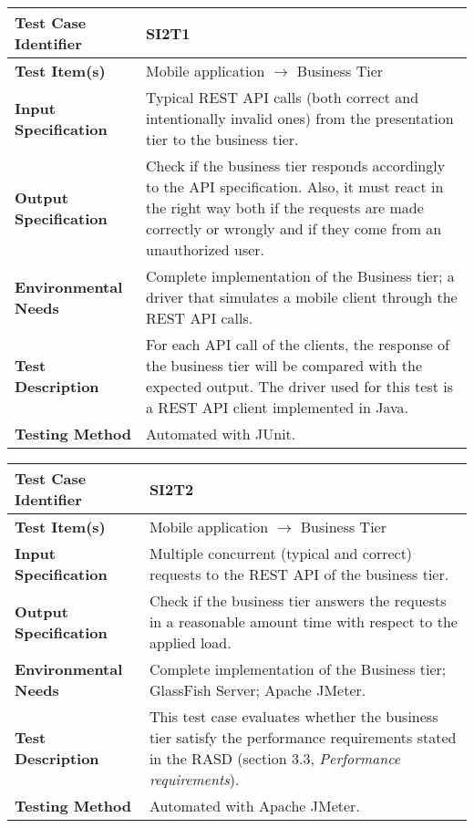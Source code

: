 \begin{tabular}{l p{}}
    \hline
    \textbf{Test Case Identifier} & SI2T1\\
    \hline
    \textbf{Test Item(s)} & Mobile application $\rightarrow$ Business Tier\\
    \hline
    \textbf{Input Specification} & Typical REST API calls (both correct and intentionally invalid ones) from the presentation tier to the business tier.\\
    \hline
    \textbf{Output Specification} & Check if the business tier responds accordingly to the API specification. Also, it must react in the right way both if the requests are made correctly or wrongly and if they come from an unauthorized user.\\
    \hline
    \textbf{Environmental Needs} & Complete implementation of the Business tier; a driver that simulates a mobile client through the REST API calls. \\
    \hline
    \textbf{Test Description} & For each API call of the clients, the response of the business tier will be compared with the expected output. The driver used for this test is a REST API client implemented in Java.\\
    \hline
    \textbf{Testing Method} & Automated with JUnit.\\
    \hline
\end{tabular}

\vspace{2em}

\noindent\begin{tabular}{l p{}}
    \hline
    \textbf{Test Case Identifier} & SI2T2\\
    \hline
    \textbf{Test Item(s)} & Mobile application $\rightarrow$ Business Tier\\
    \hline
    \textbf{Input Specification} & Multiple concurrent (typical and correct) requests to the REST API of the business tier.\\
    \hline
    \textbf{Output Specification} & Check if the business tier answers the requests in a reasonable amount time with respect to the applied load. \\
    \hline
    \textbf{Environmental Needs} & Complete implementation of the Business tier; GlassFish Server; Apache JMeter.\\
    \hline
    \textbf{Test Description} & This test case evaluates whether the business tier satisfy the performance requirements stated in the RASD (section 3.3, \emph{Performance requirements}).\\
    \hline
    \textbf{Testing Method} & Automated with Apache JMeter. \\
    \hline
\end{tabular}
